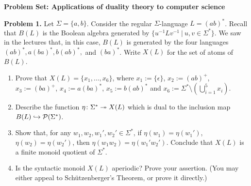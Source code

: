 

\usepackage[final]{pdfpages}
\usepackage{graphicx}



\thispagestyle{empty}
\begin{center}
{\bf Problem Set: Applications of duality theory to computer science}
\end{center}

{\bf Problem 1.} Let $\Sigma = \{a,b\}$. Consider the regular $\Sigma$-language $L = (ab)^*$. Recall that $B(L)$ is the Boolean algebra generated by $\{u^{-1}Lv^{-1} \ | \ u, v \in \Sigma^*\}$. We saw in the lectures that, in this case, $B(L)$ is generated by the four languages $(ab)^*, a(ba)^*, b(ab)^*,$ and $(ba)^*$. Write $X(L)$ for the set of atoms of $B(L)$.

\begin{enumerate}
	\item Prove that $X(L) = \{x_1,\dots,x_6\}$, where $x_1 := \{\epsilon\}$, $x_2 := (ab)^+$, $x_3 := (ba)^+$, $x_4 := a(ba)^*$, $x_5 := b(ab)^*$ and $x_6 := \Sigma^* \setminus \left(\bigcup_{i=1}^5 x_i\right)$.
	\item Describe the function $\eta \colon \Sigma^* \twoheadrightarrow X(L)$ which is dual to the inclusion map $B(L) \hookrightarrow \mathcal{P}(\Sigma^*)$.
	\item Show that, for any $w_1,w_2,w_1',w_2' \in \Sigma^*$, if $\eta(w_1) = \eta(w_1')$, $\eta(w_2) = \eta(w_2')$, then $\eta(w_1w_2) = \eta(w_1'w_2')$. Conclude that $X(L)$ is a finite monoid quotient of $\Sigma^*$.
	\item Is the syntactic monoid $X(L)$ aperiodic? Prove your assertion. (You may either appeal to Sch\"utzenberger's Theorem, or prove it directly.)
\end{enumerate}

